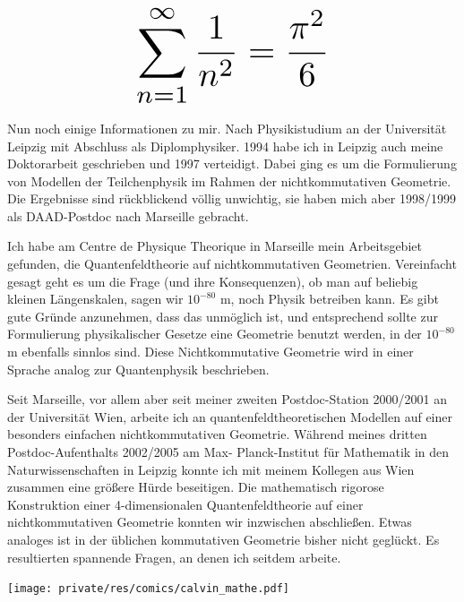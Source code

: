 \begin{multicols}{2}
\[
\resizebox{0.45\hsize}{!}{$\displaystyle\sum_{n = 1}^\infty \frac{1}{n^2} = \frac{\pi^2}{6}$}
\]

Nun noch einige Informationen zu mir. Nach Physikistudium an der Universität Leipzig mit Abschluss als Diplomphysiker. 1994 habe ich in Leipzig auch meine Doktorarbeit geschrieben und 1997 verteidigt. Dabei ging es um die Formulierung von Modellen der Teilchenphysik im Rahmen der nichtkommutativen Geometrie. Die Ergebnisse sind rückblickend völlig unwichtig, sie haben mich aber 1998/1999 als DAAD-Postdoc nach Marseille gebracht.

Ich habe am Centre de Physique Theorique in Marseille mein Arbeitsgebiet gefunden, die Quantenfeldtheorie auf nichtkommutativen Geometrien. Vereinfacht gesagt geht es um die Frage (und ihre Konsequenzen), ob man auf beliebig kleinen Längenskalen, sagen wir $10^{-80}$ m, noch Physik betreiben kann. Es gibt gute Gründe anzunehmen, dass das unmöglich ist, und entsprechend sollte zur Formulierung physikalischer Gesetze eine Geometrie benutzt werden, in der $10^{-80}$ m ebenfalls sinnlos sind. Diese Nichtkommutative Geometrie wird in einer Sprache analog zur Quantenphysik beschrieben.

Seit Marseille, vor allem aber seit meiner zweiten Postdoc-Station 2000/2001 an der Universität Wien, arbeite ich an quantenfeldtheoretischen Modellen auf einer besonders einfachen nichtkommutativen Geometrie. Während meines dritten Postdoc-Aufenthalts 2002/2005 am Max- Planck-Institut für Mathematik in den Naturwissenschaften in Leipzig konnte ich mit meinem Kollegen aus Wien zusammen eine größere Hürde beseitigen. Die mathematisch rigorose Konstruktion einer 4-dimensionalen Quantenfeldtheorie auf einer nichtkommutativen Geometrie konnten wir inzwischen abschließen. Etwas analoges ist in der üblichen kommutativen Geometrie bisher nicht geglückt. Es resultierten spannende Fragen, an denen ich seitdem arbeite.

\begin{center}
\texttt{[image: private/res/comics/calvin\_mathe.pdf]}
\end{center}
\end{multicols}
